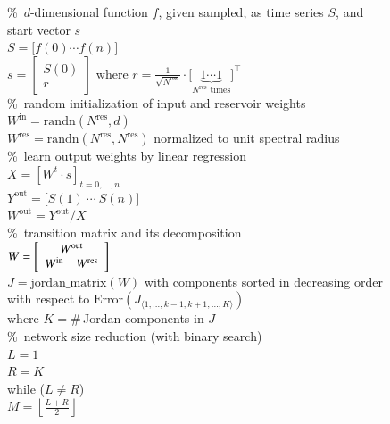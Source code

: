 \documentclass[preprint,12pt,times,authoryear]{elsarticle}%
\theoremstyle{definition}
\begin{document}
\begin{figure}\footnotesize
\newcommand{\commt}[1]{\%~#1\\}%
\begin{algorithmic}[1]\State
	\commt{$d$-dimensional function $f$, given sampled, as time series $S$, and start vector $s$}
	$S = \big[ f(0) \cdots f(n) \big]$\\
	$s = \left[ \begin{array}{c} S(0) \\ r \end{array} \right]$ where
		$r = \frac{1}{\sqrt{N^\mathrm{res}}} \cdot
		\big[ \underbrace{1 \cdots 1}_{N^\mathrm{res} \text{~times}} \big]^\top$\newline
	\\
	\commt{random initialization of input and reservoir weights}
	$W^\mathrm{in} = \mathrm{randn}(N^\mathrm{res},d)$\\
	$W^\mathrm{res} = \mathrm{randn}(N^\mathrm{res},N^\mathrm{res})$
		normalized to unit spectral radius\newline
	\\
	\commt{learn output weights by linear regression}
	$X = \left[W^t \cdot s\right]_{t=0,\dots,n}$ \\
	$Y^\mathrm{out} = \big[ S(1)\ \cdots\ S(n) \big]$\\
	$W^\mathrm{out} = Y^\mathrm{out}/X$\newline
	\\
	\commt{transition matrix and its decomposition}
	$W = \left[ \begin{array}{cc}
		\multicolumn{2}{c}{W^\mathrm{out}}\\
		W^\mathrm{in} & W^\mathrm{res}
	\end{array} \right]$\\
	$J = \mathrm{jordan\_matrix}(W)$ with components sorted in decreasing order\\
	\quad with respect to $\mathrm{Error}(J_{\langle 1,\dots,k-1,k+1,\dots,K \rangle})$\\
	\quad where $K = \#$\,Jordan components in $J$\newline
	\\
	\commt{network size reduction (with binary search)}
	$L = 1$ \\
	$R = K$ \\
	while ($L \neq R$)\\
	\quad $M = \left\lfloor\frac{L+R}{2}\right\rfloor$\\

\end{algorithmic}
\end{figure}
\end{document}
